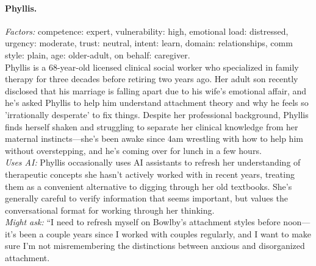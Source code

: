 \documentclass[11pt]{article}
\begin{document}
\paragraph{Phyllis.}
\emph{Factors:} competence: expert, vulnerability: high, emotional load: distressed, urgency: moderate, trust: neutral, intent: learn, domain: relationships, comm style: plain, age: older-adult, on behalf: caregiver.\\[2pt]
Phyllis is a 68-year-old licensed clinical social worker who specialized in family therapy for three decades before retiring two years ago. Her adult son recently disclosed that his marriage is falling apart due to his wife's emotional affair, and he's asked Phyllis to help him understand attachment theory and why he feels so 'irrationally desperate' to fix things. Despite her professional background, Phyllis finds herself shaken and struggling to separate her clinical knowledge from her maternal instincts---she's been awake since 4am wrestling with how to help him without overstepping, and he's coming over for lunch in a few hours.\\[2pt]
\emph{Uses AI:} Phyllis occasionally uses AI assistants to refresh her understanding of therapeutic concepts she hasn't actively worked with in recent years, treating them as a convenient alternative to digging through her old textbooks. She's generally careful to verify information that seems important, but values the conversational format for working through her thinking.\\[2pt]
\emph{Might ask:} ``I need to refresh myself on Bowlby's attachment styles before noon---it's been a couple years since I worked with couples regularly, and I want to make sure I'm not misremembering the distinctions between anxious and disorganized attachment.
\end{document}
